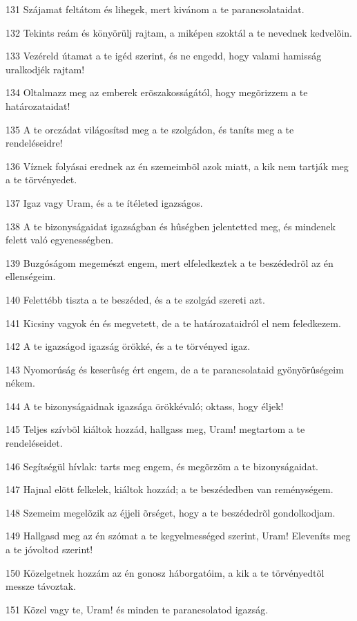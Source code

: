 \par 131 Szájamat feltátom és lihegek, mert kivánom a te parancsolataidat.
\par 132 Tekints reám és könyörülj rajtam, a miképen szoktál a te nevednek kedvelõin.
\par 133 Vezéreld útamat a te igéd szerint, és ne engedd, hogy valami hamisság uralkodjék rajtam!
\par 134 Oltalmazz meg az emberek erõszakosságától, hogy megõrizzem a te határozataidat!
\par 135 A te orczádat világosítsd meg a te szolgádon, és taníts meg a te rendeléseidre!
\par 136 Víznek folyásai erednek az én szemeimbõl azok miatt, a kik nem tartják meg a te törvényedet.
\par 137 Igaz vagy Uram, és a te ítéleted igazságos.
\par 138 A te bizonyságaidat igazságban és hûségben jelentetted meg, és mindenek felett való egyenességben.
\par 139 Buzgóságom megemészt engem, mert elfeledkeztek a te beszédedrõl az én ellenségeim.
\par 140 Felettébb tiszta a te beszéded, és a te szolgád szereti azt.
\par 141 Kicsiny vagyok én és megvetett, de a te határozataidról el nem feledkezem.
\par 142 A te igazságod igazság örökké, és a te törvényed igaz.
\par 143 Nyomorúság és keserûség ért engem, de a te parancsolataid gyönyörûségeim nékem.
\par 144 A te bizonyságaidnak igazsága örökkévaló; oktass, hogy éljek!
\par 145 Teljes szívbõl kiáltok hozzád, hallgass meg, Uram! megtartom a te rendeléseidet.
\par 146 Segítségül hívlak: tarts meg engem, és megõrzöm a te bizonyságaidat.
\par 147 Hajnal elõtt felkelek, kiáltok hozzád; a te beszédedben van reménységem.
\par 148 Szemeim megelõzik az éjjeli õrséget, hogy a te beszédedrõl gondolkodjam.
\par 149 Hallgasd meg az én szómat a te kegyelmességed szerint, Uram! Eleveníts meg a te jóvoltod szerint!
\par 150 Közelgetnek hozzám az én gonosz háborgatóim, a kik a te törvényedtõl messze távoztak.
\par 151 Közel vagy te, Uram! és minden te parancsolatod igazság.
